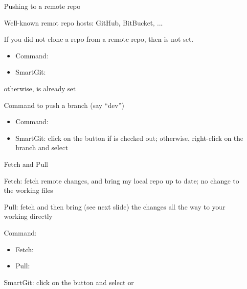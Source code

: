 \documentclass[hyperref,compress,handout,9pt,usepdftitle=false]{beamer}
\begin{document}
\begin{frame}{Pushing to a remote repo}
\begin{witemize}
\item Well-known remot repo hosts: GitHub, BitBucket, ...
\item If you did not clone a repo from a remote repo, then  is not set.
\begin{itemize}
  \item Command: 
  \item SmartGit: 
\end{itemize}
otherwise,  is already set
\item Command to push a branch (say ``dev'')
\begin{itemize}
  \item Command: 
  \item SmartGit: click on the  button if  is checked out; otherwise, right-click on the  branch and select 
\end{itemize}
\end{witemize}
\end{frame}

\begin{frame}{Fetch and Pull}
\begin{witemize}
\item Fetch: fetch remote changes, and bring my local repo up to date; no change to the working files
\item Pull: fetch and then bring (see next slide) the changes all the way to your working directly
\item Command:
\begin{itemize}
  \item Fetch:
  \item Pull:
\end{itemize}
\item SmartGit: click on the  button and select  or 
\end{witemize}
\end{frame}
\end{document}
